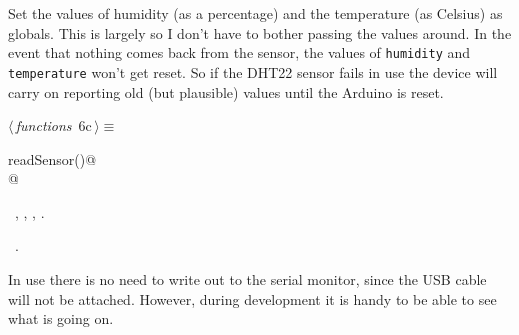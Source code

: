 \documentclass[a4paper, 11pt]{article}
\begin{document}
Set the values of humidity (as a percentage)
and the temperature (as Celsius) as globals.
This is largely so I don't have to bother passing the values around.
In the event that nothing comes back from the sensor,
the values of \verb|humidity| and \verb|temperature|
won't get reset.
So if the DHT22 sensor fails in use
the device will carry on reporting old
(but plausible) values
until the Arduino is reset.

\begin{flushleft} \small
\begin{minipage}{\linewidth}\label{scrap5}\raggedright\small
{}$\langle\,${\itshape functions}\nobreak\ {\footnotesize{6c}}$\,\rangle\equiv$
\vspace{-1ex}
\begin{list}{}{\setlength{\leftmargin}{1em}} \item
\mbox{}\lstinline@void readSensor()@\\
\mbox{}@\\
\mbox{}{\NWsep}
\end{list}
\vspace{-1ex}
\vspace{-1ex}
\footnotesize
\begin{list}{}{\setlength{\itemsep}{-\parsep}\setlength{\itemindent}{-\leftmargin}}
\item \NWtxtMacroDefBy\ , , , .
\item \NWtxtMacroRefIn\ .
\end{list}
\end{minipage}
\end{flushleft}

In use there is no need to write out to the serial monitor,
since the USB cable will not be attached.
However, during development it is handy to be able to see what is going on.
\end{document}
